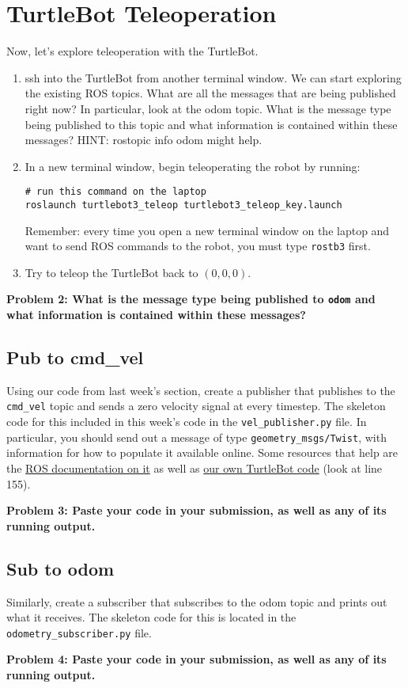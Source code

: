\section{TurtleBot Teleoperation}

Now, let's explore teleoperation with the TurtleBot.

\begin{enumerate}
\item ssh into the TurtleBot from another terminal window. We can start exploring the existing ROS topics. What are all the messages that are being published right now? In particular, look at the odom topic. What is the message type being published to this topic and what information is contained within these messages? HINT: rostopic info odom might help.
\item In a new terminal window, begin teleoperating the robot by running:
\begin{lstlisting}
# run this command on the laptop
roslaunch turtlebot3_teleop turtlebot3_teleop_key.launch
\end{lstlisting}
Remember: every time you open a new terminal window on the laptop and want to send ROS commands to the robot, you must type \texttt{rostb3} first.
\item Try to teleop the TurtleBot back to $(0,0,0)$.
\end{enumerate}

{\bf Problem 2: What is the message type being published to \texttt{odom} and what information is contained within these messages?}

\subsection{Pub to cmd\_vel}
Using our code from last week's section, create a publisher that publishes to the \texttt{cmd\_vel} topic and sends a zero velocity signal at every timestep. The skeleton code for this included in this week's code in the \texttt{vel\_publisher.py} file. In particular, you should send out a message of type \texttt{geometry\_msgs/Twist}, with information for how to populate it available online. Some resources that help are the \href{http://docs.ros.org/melodic/api/geometry_msgs/html/msg/Twist.html}{ROS documentation on it} as well as \href{https://github.com/StanfordASL/asl_turtlebot/blob/master/scripts/keyboard_teleop.py}{our own TurtleBot code} (look at line 155).

{\bf Problem 3: Paste your code in your submission, as well as any of its running output.}

\subsection{Sub to odom}
Similarly, create a subscriber that subscribes to the odom topic and prints out what it receives. The skeleton code for this is located in the \texttt{odometry\_subscriber.py} file.

{\bf Problem 4: Paste your code in your submission, as well as any of its running output.}
